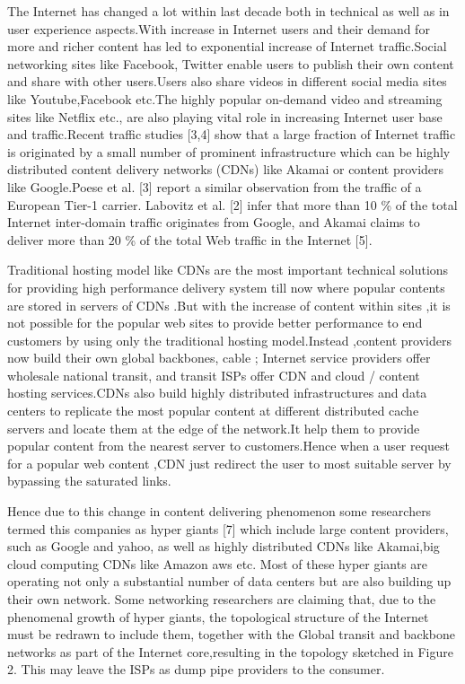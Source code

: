 The Internet has changed a lot within last decade both in technical as well as
in user experience aspects.With increase in Internet users and their demand for
more and richer content has led to exponential increase of Internet traffic.Social
networking sites like Facebook, Twitter enable users to publish their own content
and share with other users.Users also share videos in different social media sites
like Youtube,Facebook etc.The highly popular on-demand video and streaming
sites like Netflix etc., are also playing vital role in increasing Internet user base
and traffic.Recent traffic studies [3,4] show that a large fraction of Internet
traffic is originated by a small number of prominent infrastructure which can be
highly distributed content delivery networks (CDNs) like Akamai or content providers like Google.Poese et al. [3] report a similar observation from the traffic of a European Tier-1 carrier. Labovitz et al. [2] infer that more than 10 \% of the total Internet inter-domain
traffic originates from Google, and Akamai claims to deliver more than 20 \% of
the total Web traffic in the Internet [5].

Traditional hosting model like CDNs are the
most important technical solutions for providing high performance delivery system till now where popular contents are stored in servers of CDNs .But with the
increase of content within sites ,it is not possible for the popular web sites to provide better performance to end customers by using only the traditional hosting
model.Instead ,content providers now build their own global backbones, cable ;
Internet service providers offer wholesale national transit, and transit ISPs offer
CDN and cloud / content hosting services.CDNs also build highly distributed
infrastructures and data centers to replicate the most popular content at different distributed cache servers and locate them at the edge of the network.It help
them to provide popular content from the nearest server to customers.Hence
when a user request for a popular web content ,CDN just redirect the user to
most suitable server by bypassing the saturated links.

Hence due to this change in content delivering phenomenon some researchers
termed this companies as hyper giants [7] which include large content providers,
such as Google and yahoo, as well as highly distributed CDNs like Akamai,big cloud computing CDNs like Amazon aws etc. Most of these hyper giants are operating not only a substantial number of data centers but are also building up their own network. Some networking
researchers are claiming that, due to the phenomenal growth of hyper giants,
the topological structure of the Internet must be redrawn to include them, together with the Global transit and backbone networks as part of the Internet
core,resulting in the topology sketched in Figure 2. This may leave the ISPs as
dump pipe providers to the consumer.

